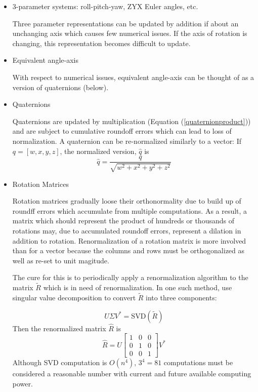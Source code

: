 \begin{itemize}

  \item 3-parameter systems:  roll-pitch-yaw,  ZYX Euler angles,  etc.

  Three parameter representations can be updated by addition if about an unchanging axis which causes few numerical issues.   If the axis of rotation is changing, this representation becomes difficult to update.

  \item Equivalent angle-axis

   With respect to numerical issues, equivalent angle-axis can be thought of as a version of quaternions (below).

  \item Quaternions

Quaternions are updated by multiplication (Equation (\ref{quaternionproduct})) and are subject to cumulative roundoff errors which can lead to loss of normalization.  A quaternion can be re-normalized similarly to a vector:
If $q = [w,x,y,z]$, the normalized version, $\hat{q}$ is
\[
\hat{q} = \frac{q}{\sqrt{w^2 + x^2 + y^2 + z^2}}
\]

  \item Rotation Matrices

Rotation matrices gradually loose their orthonormality due to build up of roundff errors which accumulate from multiple computations.   As a result, a matrix which should represent the product of hundreds or thousands of rotations may, due to accumulated roundoff errors, represent a dilation in addition to rotation.
Renormalization of a rotation matrix is more involved than for a vector because the columns and rows must be orthogonalized as well as re-set to unit magitude.

The cure for this is to periodically apply a renormalization algorithm to the matrix $\tilde{R}$ which is in need of renormalization.  In one such method, use singular value decomposition to convert $\tilde{R}$ into three components:

\[
U\Sigma V^* = \mathrm{SVD}(\tilde{R})
\]
Then the renormalized matrix $\hat{R}$ is
\[
\hat{R} = U\begin{bmatrix} 1&0&0 \\0&1&0\\0&0&1 \end{bmatrix}V^*
\]
Although SVD computation is $O(n^4)$, $3^4=81$ computations must be considered a reasonable number with current and future available computing power.



\end{itemize}





